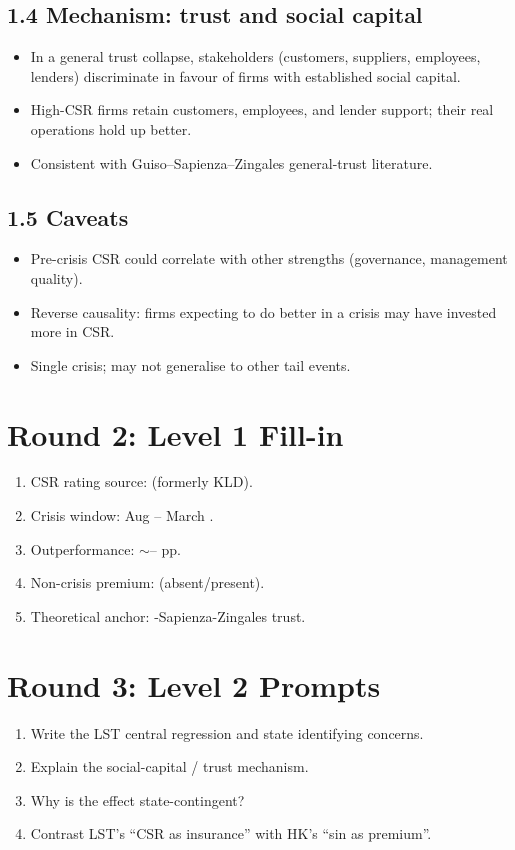 \documentclass[11pt]{article}
\newcommand{\blank}[1]{\underline{\hspace{#1}}}
\begin{document}
\subsection*{1.4 Mechanism: trust and social capital}
\begin{itemize}
\item In a general trust collapse, stakeholders (customers, suppliers, employees, lenders) discriminate in favour of firms with established social capital.
\item High-CSR firms retain customers, employees, and lender support; their real operations hold up better.
\item Consistent with Guiso--Sapienza--Zingales general-trust literature.
\end{itemize}

\subsection*{1.5 Caveats}
\begin{alertbox}
\begin{itemize}
\item Pre-crisis CSR could correlate with other strengths (governance, management quality).
\item Reverse causality: firms expecting to do better in a crisis may have invested more in CSR.
\item Single crisis; may not generalise to other tail events.
\end{itemize}
\end{alertbox}

\section*{Round 2: Level 1 Fill-in}
\begin{enumerate}
\item CSR rating source: \blank{1cm} (formerly KLD).
\item Crisis window: Aug \blank{1cm} -- March \blank{1cm}.
\item Outperformance: $\sim$\blank{1cm}--\blank{1cm} pp.
\item Non-crisis premium: \blank{1cm} (absent/present).
\item Theoretical anchor: \blank{1cm}-Sapienza-Zingales trust.
\end{enumerate}

\section*{Round 3: Level 2 Prompts}
\begin{enumerate}
\item Write the LST central regression and state identifying concerns.
\item Explain the social-capital / trust mechanism.
\item Why is the effect state-contingent?
\item Contrast LST's ``CSR as insurance'' with HK's ``sin as premium''.
\end{enumerate}
\end{document}
